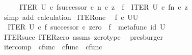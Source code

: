 \begin{isabellebody}
\ \ \isamarkupfalse%
\ \isamarkupfalse%
\ {\isachardoublequoteopen}{\isacharparenleft}{\kern0pt}ITER\ U\ {\isasymcirc}\isactrlsub c\ {\isasymlangle}f{\isacharcomma}{\kern0pt}successor\ {\isasymcirc}\isactrlsub c\ n{\isasymrangle}{\isacharparenright}{\kern0pt}\ {\isasymcirc}\isactrlsub c\ z\ {\isacharequal}{\kern0pt}\ {\isacharparenleft}{\kern0pt}f\ {\isasymbox}\ ITER\ U\ {\isasymcirc}\isactrlsub c\ {\isasymlangle}f{\isacharcomma}{\kern0pt}n{\isasymrangle}{\isacharparenright}{\kern0pt}\ {\isasymcirc}\isactrlsub c\ z{\isachardoublequoteclose}\isanewline
\ \ \ \ \isamarkupfalse%
\ {\isacharparenleft}{\kern0pt}simp\ add{\isacharcolon}{\kern0pt}\ calculation{\isacharparenright}{\kern0pt}\isanewline
{}\isamarkupfalse%
%
\endisatagproof
{\isafoldproof}%
%
\isadelimproof
\isanewline
%
\endisadelimproof
\isanewline
{}\isamarkupfalse%
\ ITER{\isacharunderscore}{\kern0pt}one{\isacharcolon}{\kern0pt}\isanewline
\ \ {\isachardoublequoteopen}f\ {\isasymin}\isactrlsub c\ {\isacharparenleft}{\kern0pt}U\isactrlbsup U\isactrlesup {\isacharparenright}{\kern0pt}{\isachardoublequoteclose}\isanewline
\ \ {\isachardoublequoteopen}ITER\ U\ {\isasymcirc}\isactrlsub c\ {\isasymlangle}f{\isacharcomma}{\kern0pt}\ successor\ {\isasymcirc}\isactrlsub c\ zero{\isasymrangle}\ {\isacharequal}{\kern0pt}\ f\ {\isasymbox}\ {\isacharparenleft}{\kern0pt}metafunc\ {\isacharparenleft}{\kern0pt}id\ U{\isacharparenright}{\kern0pt}{\isacharparenright}{\kern0pt}{\isachardoublequoteclose}\isanewline
%
\isadelimproof
\ \ %
\endisadelimproof
%
\isatagproof
{}\isamarkupfalse%
\ ITER{\isacharunderscore}{\kern0pt}succ\ ITER{\isacharunderscore}{\kern0pt}zero{\isacharprime}{\kern0pt}\ assms\ zero{\isacharunderscore}{\kern0pt}type\ \isamarkupfalse%
\ presburger%
\endisatagproof
{\isafoldproof}%
%
\isadelimproof
\isanewline
%
\endisadelimproof
\isanewline
{}\isamarkupfalse%
\ iter{\isacharunderscore}{\kern0pt}comp\ {\isacharcolon}{\kern0pt}{\isacharcolon}{\kern0pt}\ {\isachardoublequoteopen}cfunc\ {\isasymRightarrow}\ cfunc\ {\isasymRightarrow}\ cfunc{\isachardoublequoteclose}\ {\isacharparenleft}{\kern0pt}{\isachardoublequoteopen}{\isacharunderscore}{\kern0pt}\isactrlbsup {\isasymcirc}{\isacharunderscore}{\kern0pt}\ \isanewline

\end{isabellebody}
